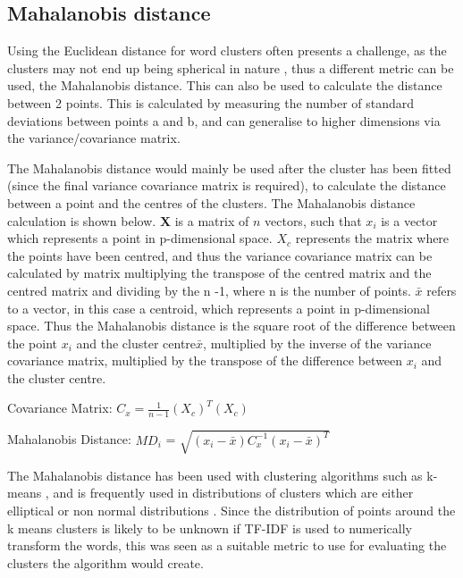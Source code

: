 \subsection{Mahalanobis distance}

Using the Euclidean distance for word clusters often presents a challenge, as the clusters may not end up being spherical in nature \cite{raykov2016k}, thus a different metric can be used, the Mahalanobis distance. This can also be used to calculate the distance between 2 points. This is calculated by measuring the number of standard deviations between points a and b, and can generalise to higher dimensions via the variance/covariance matrix.

The Mahalanobis distance would mainly be used after the cluster has been fitted (since the final variance covariance matrix is required), to calculate the distance between a point and the centres of the clusters. The Mahalanobis distance calculation is shown below. \textbf{X} is a matrix of $n$ vectors, such that \boldmath$x_{i}$ is a vector which represents a point in p-dimensional space. \boldmath$X_{c}$ represents the matrix where the points have been centred, and thus the variance covariance matrix can be calculated by matrix multiplying the transpose of the centred matrix and the centred matrix and dividing by the n -1, where n is the number of points. $\bar{ x  }$ refers to a vector, in this case a centroid, which represents a point in p-dimensional space. Thus the Mahalanobis distance is the square root of the difference between the point $x_{i}$ and the cluster centre$\bar{ x  }$, multiplied by the inverse of the variance covariance matrix, multiplied by the transpose of the difference between $x_{i}$ and the cluster centre. 


\begin{center}
	Covariance Matrix:
	\boldmath$C_{x} = \frac{1}{n - 1} (X_{c}) ^T (X_{c})$
	
	Mahalanobis Distance:
	\unboldmath$MD_{i}$ = \boldmath$\sqrt{(x_{i}  -  \bar{ x  } ) C_{x}^{-1} ( x_{i}   - \bar{ x  }  )^T    }  $
\end{center}

The Mahalanobis distance has been used with clustering algorithms such as k-means \cite{melnykov2014k} \cite{cerioli2005k}, and is frequently used in distributions of clusters which are either elliptical \cite{mitchell1985mahalanobis} or non normal distributions \cite{warren2011use}. Since the distribution of points around the k means clusters is likely to be unknown if TF-IDF is used to numerically transform the words, this was seen as a suitable metric to use for evaluating the clusters the algorithm would create.
